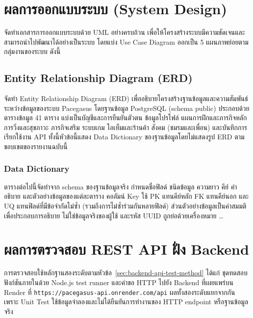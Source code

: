 \section{ผลการออกแบบระบบ (System Design)}

จัดทำเอกสารการออกแบบระบบด้วย UML อย่างครบถ้วน เพื่อให้โครงสร้างระบบมีความชัดเจนและสามารถนำไปพัฒนาได้อย่างเป็นระบบ โดยแบ่ง Use Case Diagram ออกเป็น 5 แผนภาพย่อยตามกลุ่มงานของระบบ ดังนี้

\newpage



\subsection{Entity Relationship Diagram (ERD)}

จัดทำ Entity Relationship Diagram (ERD) เพื่ออธิบายโครงสร้างฐานข้อมูลและความสัมพันธ์ระหว่างข้อมูลของระบบ Pacegasus โดยฐานข้อมูล PostgreSQL (schema public) ประกอบด้วยตารางข้อมูล 41 ตาราง แบ่งเป็นบัญชีและการยืนยันตัวตน ข้อมูลโปรไฟล์ แผนการฝึกและภารกิจหลัก การวิ่งและสุขภาวะ ภารกิจเสริม ระบบเกม ไอเท็มและร้านค้า สังคม (ชมรมและเพื่อน) และบันทึกการเรียกใช้งาน API ทั้งนี้หัวข้อนี้แสดง Data Dictionary ของฐานข้อมูลโดยไม่แสดงรูป ERD ตามขอบเขตของรายงานฉบับนี้

\subsubsection{Data Dictionary}

ตารางต่อไปนี้จัดทำจาก schema ของฐานข้อมูลจริง กำหนดชื่อฟิลด์ ชนิดข้อมูล ความยาว คีย์ คำอธิบาย และตัวอย่างข้อมูลของแต่ละตาราง คอลัมน์ Key ใช้ PK แทนคีย์หลัก FK แทนคีย์นอก และ UQ แทนฟิลด์ที่มีข้อจำกัดไม่ซ้ำ (รวมถึงการไม่ซ้ำร่วมกันหลายฟิลด์) ส่วนตัวอย่างข้อมูลเป็นค่าสมมติเพื่อประกอบการอธิบาย ไม่ใช่ข้อมูลจริงของผู้ใช้ และรหัส UUID ถูกย่อด้วยเครื่องหมาย …



\section{ผลการตรวจสอบ REST API ฝั่ง Backend}
\label{sec:backend-api-test-results}

การตรวจสอบใช้หลักฐานสองระดับตามหัวข้อ~\ref{sec:backend-api-test-method} ได้แก่ ชุดทดสอบฟังก์ชันภายในด้วย Node.js test runner และคำขอ HTTP ไปยัง Backend ที่เผยแพร่บน Render ที่ \texttt{https://pacegasus-api.onrender.com/api} ผลทั้งสองระดับแยกจากกัน เพราะ Unit Test ใช้ข้อมูลจำลองและไม่ได้ยืนยันการทำงานของ HTTP endpoint หรือฐานข้อมูลจริง

